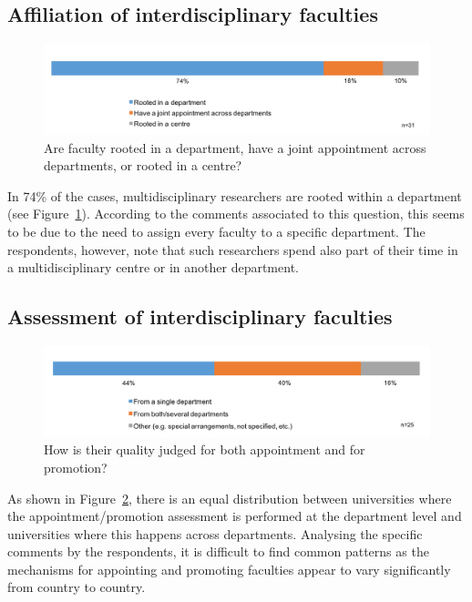 \subsection{Affiliation of interdisciplinary faculties}
\begin{figure}[h]
\centering
\includegraphics[width = \linewidth]{charts/3b.png}
\caption{Are faculty rooted in a department, have a joint appointment across departments, or rooted in a centre?}
\label{sect3:affiliation}
\end{figure}

In 74\% of the cases, multidisciplinary researchers are rooted within
a department (see Figure~\ref{sect3:affiliation}). 
According to the comments associated to this question,
this seems to be due to the need to assign every faculty to a specific
department. The respondents, however, note that such researchers spend
also part of their time in a multidisciplinary centre or in another
department. 

\subsection{Assessment of interdisciplinary faculties}


\begin{figure}[h]
\centering
\includegraphics[width = \linewidth]{charts/3c.png}
\caption{How is their quality judged for both appointment and for promotion?}
\label{sect3:assessment}
\end{figure}

As shown in Figure~\ref{sect3:assessment}, there is an equal distribution between universities
where the appointment/promotion assessment is performed at the
department level and universities where this happens across
departments. Analysing the specific comments by the respondents, it is
difficult to find common patterns as the mechanisms for appointing and
promoting faculties appear to vary significantly from country to
country. 

